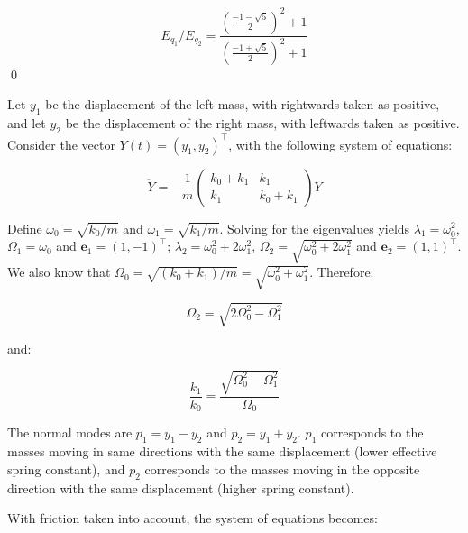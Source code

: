 \documentclass[12pt]{article}
\begin{document}
\begin{equation}
    E_{q_{1}}/E_{q_{2}} = \frac{\left( \frac{-1-\sqrt{5}}{2} \right)^{2} + 1}{\left( \frac{-1+\sqrt{5}}{2} \right)^{2} + 1}
\end{equation}
\qed



Let $y_{1}$ be the displacement of the left mass, with rightwards taken as positive, and let $y_{2}$ be the displacement of the right mass, with leftwards taken as positive. Consider the vector $Y(t) = (y_{1}, y_{2})^{\intercal}$, with the following system of equations:

\begin{equation}
    \ddot{Y} =
    -\frac{1}{m}
    \begin{pmatrix}
        k_{0} + k_{1} & k_{1}         \\
        k_{1}         & k_{0} + k_{1}
    \end{pmatrix}
    Y
\end{equation}

Define $\omega_{0} = \sqrt{k_{0}/m}$ and $\omega_{1} = \sqrt{k_{1}/m}$. Solving for the eigenvalues yields $\lambda_{1} = \omega_{0}^{2}$, $\Omega_{1} = \omega_{0}$ and $\mathbf{e}_{1} = (1, -1)^{\intercal}$; $\lambda_{2} = \omega_{0}^{2} + 2\omega_{1}^{2}$, $\Omega_{2} = \sqrt{\omega_{0}^{2} + 2\omega_{1}^{2}}$ and $\mathbf{e}_{2} = (1, 1)^{\intercal}$. We also know that $\Omega_{0} = \sqrt{(k_{0} + k_{1})/m} = \sqrt{\omega_{0}^{2} + \omega_{1}^{2}}$. Therefore:

\begin{equation}
    \Omega_{2} = \sqrt{2\Omega_{0}^{2} - \Omega_{1}^{2}}
\end{equation}

and:

\begin{equation}
    \frac{k_{1}}{k_{0}} = \frac{\sqrt{\Omega_{0}^{2} - \Omega_{1}^{2}}}{\Omega_{0}}
\end{equation}

The normal modes are $p_{1} = y_{1} - y_{2}$ and $p_{2} = y_{1} + y_{2}$. $p_{1}$ corresponds to the masses moving in same directions with the same displacement (lower effective spring constant), and $p_{2}$ corresponds to the masses moving in the opposite direction with the same displacement (higher spring constant).

With friction taken into account, the system of equations becomes:
\end{document}
